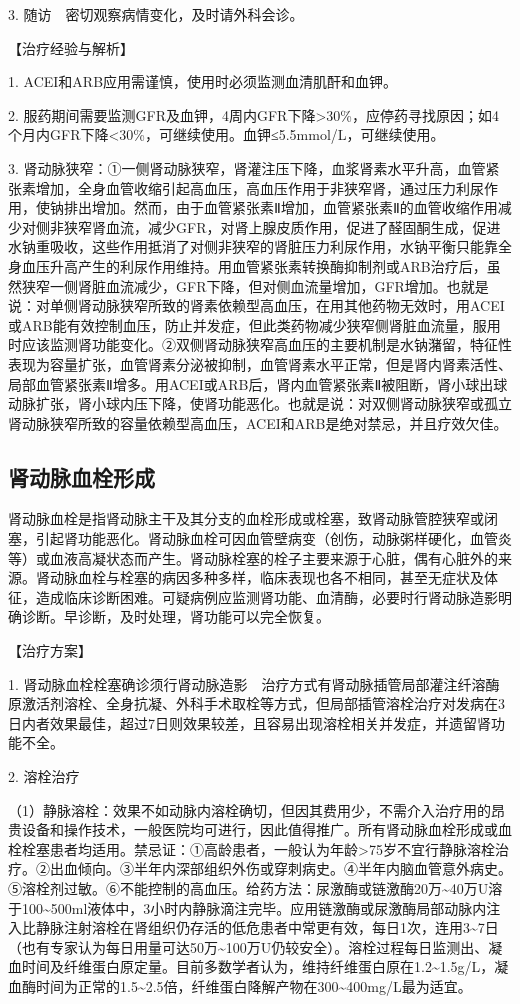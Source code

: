 3. 随访　密切观察病情变化，及时请外科会诊。

【治疗经验与解析】

1. ACEI和ARB应用需谨慎，使用时必须监测血清肌酐和血钾。

2.
服药期间需要监测GFR及血钾，4周内GFR下降\textgreater{}30\%，应停药寻找原因；如4个月内GFR下降\textless{}30\%，可继续使用。血钾≤5.5mmol/L，可继续使用。

3.
肾动脉狭窄：①一侧肾动脉狭窄，肾灌注压下降，血浆肾素水平升高，血管紧张素增加，全身血管收缩引起高血压，高血压作用于非狭窄肾，通过压力利尿作用，使钠排出增加。然而，由于血管紧张素Ⅱ增加，血管紧张素Ⅱ的血管收缩作用减少对侧非狭窄肾血流，减少GFR，对肾上腺皮质作用，促进了醛固酮生成，促进水钠重吸收，这些作用抵消了对侧非狭窄的肾脏压力利尿作用，水钠平衡只能靠全身血压升高产生的利尿作用维持。用血管紧张素转换酶抑制剂或ARB治疗后，虽然狭窄一侧肾脏血流减少，GFR下降，但对侧血流量增加，GFR增加。也就是说：对单侧肾动脉狭窄所致的肾素依赖型高血压，在用其他药物无效时，用ACEI或ARB能有效控制血压，防止并发症，但此类药物减少狭窄侧肾脏血流量，服用时应该监测肾功能变化。②双侧肾动脉狭窄高血压的主要机制是水钠潴留，特征性表现为容量扩张，血管肾素分泌被抑制，血管肾素水平正常，但是肾内肾素活性、局部血管紧张素Ⅱ增多。用ACEI或ARB后，肾内血管紧张素Ⅱ被阻断，肾小球出球动脉扩张，肾小球内压下降，使肾功能恶化。也就是说：对双侧肾动脉狭窄或孤立肾动脉狭窄所致的容量依赖型高血压，ACEI和ARB是绝对禁忌，并且疗效欠佳。

\subsection{肾动脉血栓形成}

肾动脉血栓是指肾动脉主干及其分支的血栓形成或栓塞，致肾动脉管腔狭窄或闭塞，引起肾功能恶化。肾动脉血栓可因血管壁病变（创伤，动脉粥样硬化，血管炎等）或血液高凝状态而产生。肾动脉栓塞的栓子主要来源于心脏，偶有心脏外的来源。肾动脉血栓与栓塞的病因多种多样，临床表现也各不相同，甚至无症状及体征，造成临床诊断困难。可疑病例应监测肾功能、血清酶，必要时行肾动脉造影明确诊断。早诊断，及时处理，肾功能可以完全恢复。

【治疗方案】

1.
肾动脉血栓栓塞确诊须行肾动脉造影　治疗方式有肾动脉插管局部灌注纤溶酶原激活剂溶栓、全身抗凝、外科手术取栓等方式，但局部插管溶栓治疗对发病在3日内者效果最佳，超过7日则效果较差，且容易出现溶栓相关并发症，并遗留肾功能不全。

2. 溶栓治疗

（1）静脉溶栓：效果不如动脉内溶栓确切，但因其费用少，不需介入治疗用的昂贵设备和操作技术，一般医院均可进行，因此值得推广。所有肾动脉血栓形成或血栓栓塞患者均适用。禁忌证：①高龄患者，一般认为年龄\textgreater{}75岁不宜行静脉溶栓治疗。②出血倾向。③半年内深部组织外伤或穿刺病史。④半年内脑血管意外病史。⑤溶栓剂过敏。⑥不能控制的高血压。给药方法：尿激酶或链激酶20万\textasciitilde{}40万U溶于100\textasciitilde{}500ml液体中，3小时内静脉滴注完毕。应用链激酶或尿激酶局部动脉内注入比静脉注射溶栓在肾组织仍存活的低危患者中常更有效，每日1次，连用3\textasciitilde{}7日（也有专家认为每日用量可达50万\textasciitilde{}100万U仍较安全）。溶栓过程每日监测出、凝血时间及纤维蛋白原定量。目前多数学者认为，维持纤维蛋白原在1.2\textasciitilde{}1.5g/L，凝血酶时间为正常的1.5\textasciitilde{}2.5倍，纤维蛋白降解产物在300\textasciitilde{}400mg/L最为适宜。

